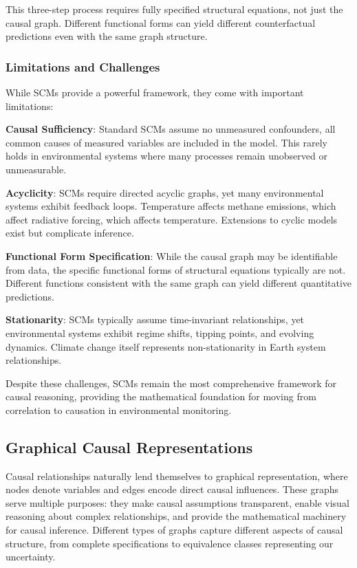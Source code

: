 This three-step process requires fully specified structural equations, not just the causal graph. Different functional forms can yield different counterfactual predictions even with the same graph structure.

\subsubsection{Limitations and Challenges}

While SCMs provide a powerful framework, they come with important limitations:

\textbf{Causal Sufficiency}: Standard SCMs assume no unmeasured confounders, all common causes of measured variables are included in the model. This rarely holds in environmental systems where many processes remain unobserved or unmeasurable.

\textbf{Acyclicity}: SCMs require directed acyclic graphs, yet many environmental systems exhibit feedback loops. Temperature affects methane emissions, which affect radiative forcing, which affects temperature. Extensions to cyclic models exist but complicate inference.

\textbf{Functional Form Specification}: While the causal graph may be identifiable from data, the specific functional forms of structural equations typically are not. Different functions consistent with the same graph can yield different quantitative predictions.

\textbf{Stationarity}: SCMs typically assume time-invariant relationships, yet environmental systems exhibit regime shifts, tipping points, and evolving dynamics. Climate change itself represents non-stationarity in Earth system relationships.

Despite these challenges, SCMs remain the most comprehensive framework for causal reasoning, providing the mathematical foundation for moving from correlation to causation in environmental monitoring.

\subsection{Graphical Causal Representations}

Causal relationships naturally lend themselves to graphical representation, where nodes denote variables and edges encode direct causal influences. These graphs serve multiple purposes: they make causal assumptions transparent, enable visual reasoning about complex relationships, and provide the mathematical machinery for causal inference. Different types of graphs capture different aspects of causal structure, from complete specifications to equivalence classes representing our uncertainty.

